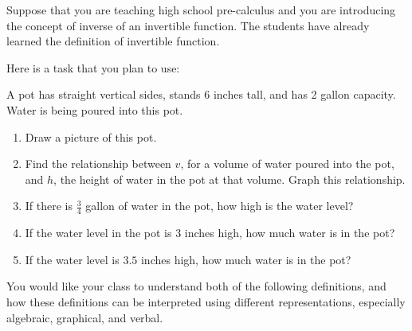 \documentclass[11pt]{article}
\theoremstyle{definition}
\begin{document}

Suppose that you are teaching high school pre-calculus and you are introducing the concept of inverse of an invertible function. The students have already learned the definition of invertible function.  

Here is a task that you plan to use:

	\begin{mdframed}
	 A pot has straight vertical sides, stands 6 inches tall, and has 2 gallon capacity.  Water is being poured into this pot. 
		\begin{enumerate}[label=(\alph*)]
		\item Draw a picture of this pot.
		\item Find the relationship between $v$, for a volume of water poured into the pot, and $h$, the height of water in the pot at that volume. Graph this relationship.
		\item If there is $\frac{3}{4}$ gallon of water in the pot, how high is the water level?
		\item If the water level in the pot is $3$ inches high, how much water is in the pot?
		\item If the water level is $3.5$ inches high, how much water is in the pot?
		\end{enumerate}
	\end{mdframed}
	
You would like your class to understand both of the following definitions, and how these definitions can be interpreted using different representations, especially algebraic, graphical, and verbal.
\end{document}
